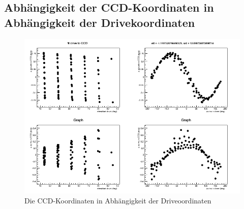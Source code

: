 \subsection{Abhängigkeit der CCD-Koordinaten in Abhängigkeit der Drivekoordinaten}
\begin{figure}[htbp]
\centering
\includegraphics[width=\textwidth]{../341/run341D2C4.png}
\caption{Die CCD-Koordinaten in Abhängigkeit der Driveoordinaten}
\label{img:D2C4}
\end{figure}